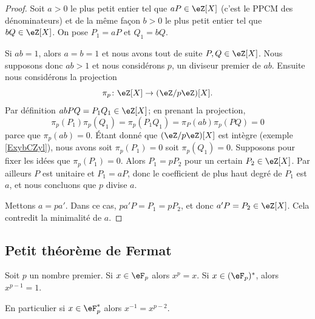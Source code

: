 \begin{proof}
    Soit \( a>0\) le plus petit entier tel que \( aP\in\eZ[X]\) (c'est le PPCM des dénominateurs) et de la même façon \( b>0\) le plus petit entier tel que \( bQ\in \eZ[X]\). On pose \( P_1=aP\) et \( Q_1=bQ\).

    Si \( ab=1\), alors \( a=b=1\) et nous avons tout de suite \( P,Q\in \eZ[X]\). Nous supposons donc \( ab>1\) et nous considérons \( p\), un diviseur premier de \( ab\). Ensuite nous considérons la projection
    \begin{equation}
        \pi_p\colon \eZ[X]\to (\eZ/p\eZ)[X].
    \end{equation}
    Par définition \( abPQ=P_1Q_1\in \eZ[X]\); en prenant la projection,
    \begin{equation}
        \pi_p(P_1)\pi_p(Q_1)=\pi_p(P_1Q_1)=\pi_P(ab)\pi_p(PQ)=0
    \end{equation}
    parce que \( \pi_p(ab)=0\). Étant donné que \( (\eZ/p\eZ)[X]\) est intègre (exemple \ref{ExybCZyl}), nous avons soit \( \pi_p(P_1)=0\) soit \( \pi_p(Q_1)=0\). Supposons pour fixer les idées que \( \pi_p(P_1)=0\). Alors \( P_1=pP_2\) pour un certain \( P_2\in \eZ[X]\). Par ailleurs \( P\) est unitaire et \( P_1=aP\), donc le coefficient de plus haut degré de \( P_1\) est \( a\), et nous concluons que \( p\) divise \( a\).
    
    Mettons \( a=pa'\). Dans ce cas, \( pa'P=P_1=pP_2\), et donc \( a'P=P_2\in \eZ[X]\). Cela contredit la minimalité de \( a\).
\end{proof}

\subsection{Petit théorème de Fermat}

\begin{theorem}       \label{ThoOPQOiO}   
    Soit \( p\) un nombre premier. Si \( x\in \eF_p\) alors \( x^p=x\). Si \( x\in(\eF_p)^*\), alors \( x^{p-1}=1\).

    En particulier si \( x\in \eF_p^*\) alors \( x^{-1}=x^{p-2}\).
\end{theorem}

